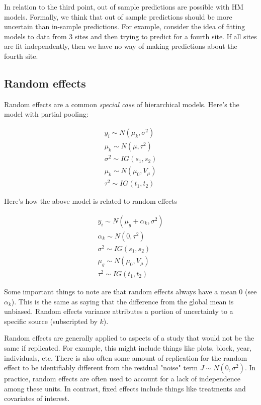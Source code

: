 \documentclass[12pt, oneside]{article}   	%
\begin{document}
In relation to the third point, out of sample predictions are possible with HM models.  Formally, we think that out of sample predictions should be more uncertain than in-sample predictions. For example, consider the idea of fitting models to data from 3 sites and then trying to predict for a fourth site. If all sites are fit independently, then we have no way of making predictions about the fourth site.  

\subsection{Random effects}

Random effects are a common \textit{special case} of hierarchical models. Here's the model with partial pooling:

\begin{align}
 y_i \sim N(\mu_k, \sigma^2) \\
 \mu_k \sim N(\mu, \tau^2) \\
 \sigma^2 \sim IG(s_1, s_2) \\
  \mu_k \sim N(\mu_0, V_{\mu}) \\
\tau^2 \sim IG(t_1, t_2)
\end{align}

Here's how the above model is related to random effects

\begin{align}
 y_i \sim N( \mu_g + \alpha_k, \sigma^2) \\
 \alpha_k \sim N(0, \tau^2) \\
 \sigma^2 \sim IG(s_1, s_2) \\
  \mu_g \sim N(\mu_0, V_{\mu}) \\
\tau^2 \sim IG(t_1, t_2)
\end{align}

Some important things to note are that random effects always have a mean 0 (see $\alpha_k$). This is the same as saying that the difference from the global mean is unbiased. Random effects variance attributes a portion of uncertainty to a specific source (subscripted by $k$).

Random effects are generally applied to aspects of a study that would not be the same if replicated. For example, this might include things like plots, block, year, individuals, etc. There is also often some amount of replication for the random effect to be identifiably different from the residual "noise" term $J \sim N(0, \sigma^2) $. In practice, random effects are often used to account for a lack of independence among these units. In contrast, fixed effects include things like treatments and covariates of interest. 
\end{document}
